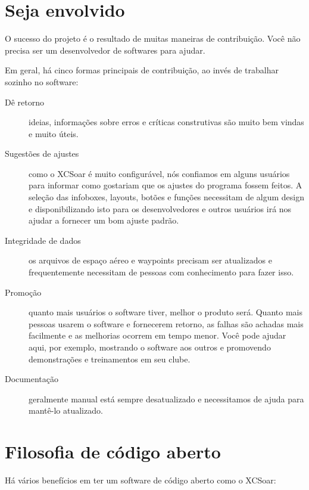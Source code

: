 \section{Seja envolvido}

O sucesso do projeto é o resultado de muitas maneiras de contribuição. Você não precisa ser um desenvolvedor de softwares para ajudar.

Em geral, há cinco formas principais de contribuição, ao invés de trabalhar sozinho no software:

\begin{description}
\item[Dê retorno]
ideias, informações sobre erros e críticas construtivas são muito bem vindas e muito úteis.
\item[Sugestões de ajustes]
como o XCSoar é muito configurável, nós confiamos em alguns usuários para informar como gostariam que os ajustes do programa fossem feitos.  A seleção das infoboxes, layouts, botões e funções necessitam de algum design e disponibilizando isto para os desenvolvedores e outros usuários irá nos ajudar a fornecer um bom ajuste padrão.
\item[Integridade de dados]
os arquivos de espaço aéreo e waypoints precisam ser atualizados e frequentemente necessitam de pessoas com conhecimento para fazer isso.
\item[Promoção]  quanto mais usuários o software tiver, melhor o produto será.  Quanto mais pessoas usarem o software e fornecerem retorno, as falhas são achadas mais facilmente e as melhorias ocorrem em tempo menor.  Você pode ajudar aqui, por exemplo, mostrando o software aos outros e promovendo demonstrações e treinamentos em seu clube.
\item[Documentação]  geralmente manual está sempre desatualizado e necessitamos de ajuda para mantê-lo atualizado.
\end{description}


\section{Filosofia de código aberto}

Há vários benefícios em ter um software de código aberto como o XCSoar:

